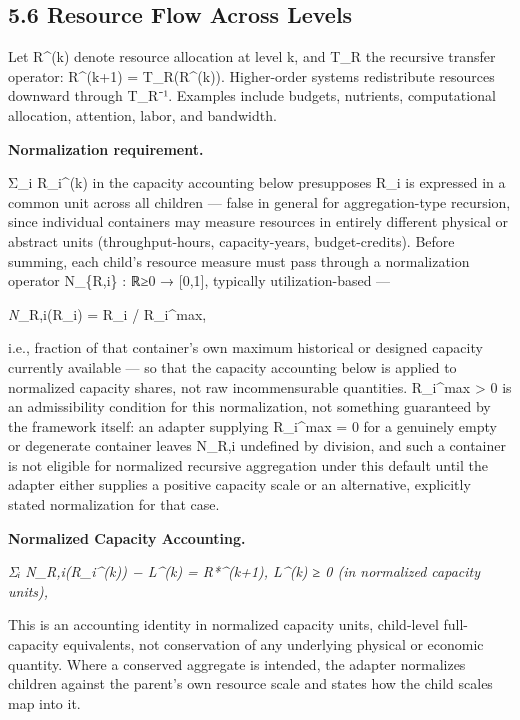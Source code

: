 \documentclass[
]{article}
\begin{document}
\hypertarget{resource-flow-across-levels}{%
\subsection{5.6 Resource Flow Across
Levels}\label{resource-flow-across-levels}}

Let R\^{}(k) denote resource allocation at level k, and T\_R the
recursive transfer operator: R\^{}(k+1) = T\_R(R\^{}(k)). Higher-order
systems redistribute resources downward through T\_R⁻¹. Examples include
budgets, nutrients, computational allocation, attention, labor, and
bandwidth.

\textbf{Normalization requirement.}

Σ\_i R\_i\^{}(k) in the capacity accounting below presupposes R\_i is
expressed in a common unit across all children --- false in general for
aggregation-type recursion, since individual containers may measure
resources in entirely different physical or abstract units
(throughput-hours, capacity-years, budget-credits). Before summing, each
child's resource measure must pass through a normalization operator
N\_\{R,i\} : ℝ≥0 → {[}0,1{]}, typically utilization-based ---

\emph{N}\_R,i(R\_i) = R\_i / R\_i\^{}max,

i.e., fraction of that container's own maximum historical or designed
capacity currently available --- so that the capacity accounting below
is applied to normalized capacity shares, not raw incommensurable
quantities. R\_i\^{}max \textgreater{} 0 is an admissibility condition
for this normalization, not something guaranteed by the framework
itself: an adapter supplying R\_i\^{}max = 0 for a genuinely empty or
degenerate container leaves N\_R,i undefined by division, and such a
container is not eligible for normalized recursive aggregation under
this default until the adapter either supplies a positive capacity scale
or an alternative, explicitly stated normalization for that case.

\textbf{Normalized Capacity Accounting.}

\emph{Σᵢ N\_R,i(R\_i\^{}(k)) − L\^{}(k) = R*\^{}(k+1), L\^{}(k) ≥ 0 (in
normalized capacity units),}

This is an accounting identity in normalized capacity units, child-level
full-capacity equivalents, not conservation of any underlying physical
or economic quantity. Where a conserved aggregate is intended, the
adapter normalizes children against the parent's own resource scale and
states how the child scales map into it.
\end{document}
